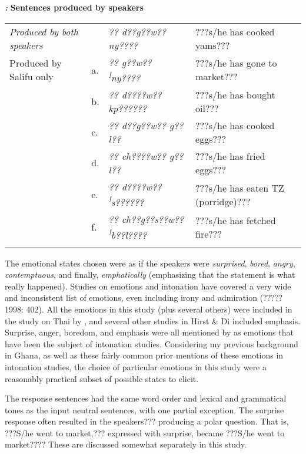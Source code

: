 \documentclass[output=paper]{langsci/langscibook}
\begin{document}
\emph{\textbf{\textup{:}}}\textbf{\textit{ }}\textbf{Sentences produced by speakers}\textbf{\textit{ }}

\begin{tabular}{llll}
\lsptoprule

\emph{\textup{Produced by both speakers}} &  & \textit{?? d??g??w?? ny????        } & ???s/he has cooked yams???\\
Produced by Salifu only & a. & \textit{?? g??w?? }\textit{\textsuperscript{!}}\textit{ny????} & ???s/he has gone to market???\\
& b. & \textit{?? d????w?? kp??????} & ???s/he has bought oil???\\
& c. & \textit{?? d??g??w?? g??l??} & ???s/he has cooked eggs???\\
& d. & \textit{?? ch????w?? g??l??} & ???s/he has fried eggs???\\
& e. & \textit{?? d????w?? }\textit{\textsuperscript{!}}\textit{s??????} & ???s/he has eaten TZ (porridge)???\\
& f. & \textit{?? ch??g??s??w?? }\textit{\textsuperscript{!}}\textit{b??l????} & ???s/he has fetched fire???  \\
\lspbottomrule
\end{tabular}
The emotional states chosen were as if the speakers were \emph{surprised}, \emph{bored}, \emph{angry}, \emph{contemptuous}, and finally, \emph{emphatically} (emphasizing that the statement is what really happened). Studies on emotions and intonation have covered a very wide and inconsistent list of emotions, even including irony and admiration (????? 1998: 402). All the emotions in this study (plus several others) were included in the study on Thai by \citet{Luksaneeyanawin1998}, and several other studies in Hirst \& Di\citet{Cristo1998} included emphasis. Surprise, anger, boredom, and emphasis were all mentioned by \citet{Ladd2008} as emotions that have been the subject of intonation studies. Considering my previous background in Ghana, as well as these fairly common prior mentions of these emotions in intonation studies, the choice of particular emotions in this study were a reasonably practical subset of possible states to elicit.

The response sentences had the same word order and lexical and grammatical tones as the input neutral sentences, with one partial exception. The surprise response often resulted in the speakers??? producing a polar question. That is, ???S/he went to market,??? expressed with surprise, became ???S/he went to market???? These are discussed somewhat separately in this study. 
\end{document}
